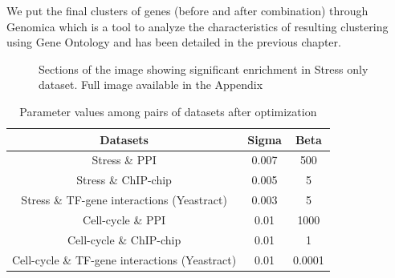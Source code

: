 We put the final clusters of genes (before and after combination) through Genomica which is a tool to analyze the characteristics of resulting clustering using Gene Ontology and has been detailed in the 
previous chapter.
 
\begin{figure}[p]
\centering
{}
\label{fig:stress_only_enrich}
\caption[]{Sections of the image showing significant enrichment in Stress only dataset. Full image available in the Appendix}
\end{figure}


\begin{table}[t]
\centering
\begin{tabular}{|c|c|c|}
\hline
Datasets & Sigma & Beta \\
\hline
Stress \& PPI                              & 0.007 & 500 \\ 
Stress \& ChIP-chip                        & 0.005 &  5\\
Stress \& TF-gene interactions (Yeastract) & 0.003 &  5\\
\hline \hline
Cell-cycle \& PPI                              & 0.01 & 1000 \\ 
Cell-cycle \& ChIP-chip                        & 0.01 & 1 \\
Cell-cycle \& TF-gene interactions (Yeastract) & 0.01 & 0.0001 \\
\hline 
\end{tabular}
\caption{Parameter values among pairs of datasets after optimization}
\label{tab:maxent_mean_pvals}
\end{table}
\clearpage


